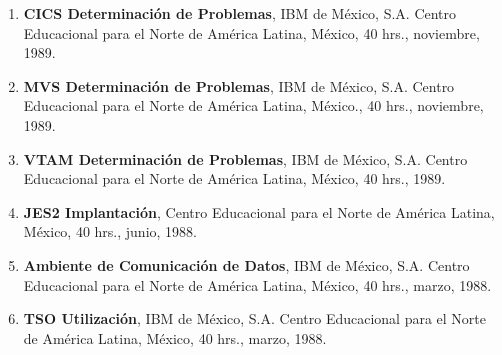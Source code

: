 \documentclass[11pt]{article}
\begin{document}
\begin{enumerate}
\item \textbf{CICS Determinación de Problemas}, IBM de México, S.A. Centro Educacional para el Norte de América Latina, México, 40 hrs., noviembre, 
1989.

\item \textbf{MVS Determinación de Problemas}, IBM de México, S.A. Centro Educacional para el Norte de América Latina, México., 40 hrs., noviembre, 1989.

\item \textbf{VTAM Determinación de Problemas}, IBM de México, S.A. Centro Educacional para el Norte de América Latina, México, 40 hrs., 1989.

\item \textbf{JES2 Implantación}, Centro Educacional para el Norte de América Latina, México, 40 hrs., junio, 1988.

\item \textbf{Ambiente de Comunicación de Datos}, IBM de México, S.A. Centro Educacional para el Norte de América Latina, México, 40 hrs., marzo, 1988. 

\item \textbf{TSO Utilización}, IBM de México, S.A. Centro Educacional para el Norte de América Latina, México, 40 hrs., marzo, 1988.

\end{enumerate}
\end{document}
